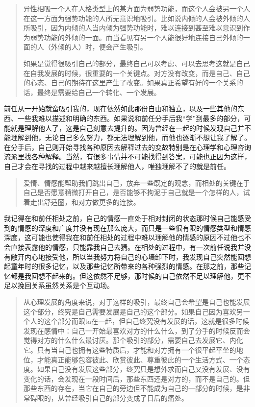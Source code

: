 \blockquote{
	异性相吸\pozhehao{}一个人在人格类型上的某方面为弱势功能，而这个人会被另一个人在这一方面为强势功能的人所无意识地吸引。比如说内倾的人会被外倾的人所吸引，因为内倾的人当内倾为强势功能时，难以连接到甚至难以意识到作为弱势功能的外倾的一面。而当看见有另一个人能很好地连接自己外倾的一面的人（外倾的人）时，便会产生吸引。

	如果是觉得很吸引自己的部分，最终自己可以考虑、可以去思考这就是自己在自我发展的时候，很重要的一个关键点。对方没有改变，而是自己、自己的心态、自己的期待在这里产生了改变。如果真正希望有好的一个关系的话，最终是需要给自己一个转化、一个发展。

}

前任从一开始就蛮吸引我的，现在依然如此\pozhehao{}那份自由和独立，以及一些其他的东西、一些我难以描述和明确的东西。如果说和前任分手后我“学”到最多的部分，可能就是理解他人了，这是自己刻意去提升的。因为曾经在一起的时候发现自己并不能理解到他，无论自己多么努力，都无法理解到他，而他也逐渐不想让我了解了。在分手后，自己则开始寻找各种原因去解释过去的变故\pozhehao{}特别是在心理学和心理咨询流派里找各种解释。当然，有很多事情并不可能找得到答案，可能也正因为这样，自己才会在寻找的过程中越来越擅长理解他人，唯独理解不了的就是前任。

\blockquote{
	爱情、情感能帮助我们跳出自己，放弃一些既定的观念，而相处的关键在于自己是否愿意稍微打开自己，是否能够不拘泥于自己就是一个怎样的人，试着走出舒适圈，和对方做更多的连接。

}

我记得在和前任相处之前，自己的情感一直处于相对封闭的状态\pozhehao{}那时候自己能感受到的情感的深度和广度并没有现在那么庞大，而只是一些很有限的情感类型和情感深度，这可能也使得我在和前任相处的过程中难以理解他的情感的原因\pozhehao{}不过他也不会直接表露他的情感，只能靠我自己去猜。在相处的过程中，有一次前任说我并没有敞开内心地接受他，所以当我努力将自己的心墙卸下时，我发现自己突然能回想起童年时的很多记忆，以及那些记忆所带来的各种强烈的情感。在那之前，那些记忆都是我回想不起来的。但这依然不足够，那时候的自己依然不足以理解他，更不足以挽回关系\pozhehao{}虽然关系是个互动场。

\blockquote{
    从心理发展的角度来说，对于这样的吸引，最终自己会希望是自己也能发展这个部分，终究是自己需要发展是自己的这个部分。如果自己因为喜欢另一个人的这个部分而跟ta在一起，但自己终究没有发展的话，这就是很多时候发现在感情中：自己一开始最喜欢对方的什么什么，到了分手的时候反而会觉得对方的什么什么最讨厌。那个吸引的部分，需要自己去发展它、内化它。只有当自己也拥有这些特质后，才能和对方拥有一个很平起平坐的地位，才能真正能够包容彼此、欣赏彼此、尊重彼此的一个生活方式、一个态度。如果自己没有发展这些部分，终究只是想外求而自己又没有发展、没有变化的话，会发现在一段时间后，那些东西还是对方的，而不是自己的。但那些东西的存在，当它在自己的旁边但不能成为自己的一部分的时候，是非常碍眼的，从曾经吸引自己的部分变成了日后的痛处。
    
}

